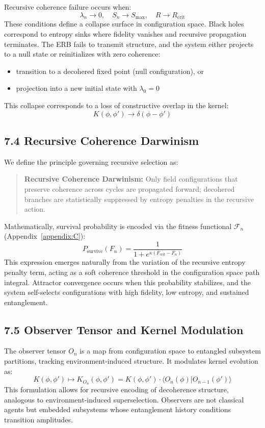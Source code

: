 Recursive coherence failure occurs when:
\[
\lambda_n \to 0, \quad S_n \to S_{\text{max}}, \quad R \to R_{\text{crit}}
\]
These conditions define a collapse surface in configuration space. Black holes correspond to entropy sinks where fidelity vanishes and recursive propagation terminates. The ERB fails to transmit structure, and the system either projects to a null state or reinitializes with zero coherence:
\begin{itemize}
    \item transition to a decohered fixed point (null configuration), or
    \item projection into a new initial state with \( \lambda_0 = 0 \)
\end{itemize}
This collapse corresponds to a loss of constructive overlap in the kernel:
\[
K(\phi, \phi') \to \delta(\phi - \phi')
\]

\subsection{7.4 Recursive Coherence Darwinism}

We define the principle governing recursive selection as:
\begin{quote}
\textbf{Recursive Coherence Darwinism:} Only field configurations that preserve coherence across cycles are propagated forward; decohered branches are statistically suppressed by entropy penalties in the recursive action.
\end{quote}

Mathematically, survival probability is encoded via the fitness functional \( \mathcal{F}_n \) (Appendix~\ref{appendix:C}):
\[
P_{\text{survive}}(F_n) = \frac{1}{1 + e^{\kappa(F_{\text{crit}} - F_n)}}
\]
This expression emerges naturally from the variation of the recursive entropy penalty term, acting as a soft coherence threshold in the configuration space path integral. Attractor convergence occurs when this probability stabilizes, and the system self-selects configurations with high fidelity, low entropy, and sustained entanglement.

\subsection{7.5 Observer Tensor and Kernel Modulation}

The observer tensor \( O_n \) is a map from configuration space to entangled subsystem partitions, tracking environment-induced structure. It modulates kernel evolution as:
\[
K(\phi, \phi') \mapsto K_{O_n}(\phi, \phi') = K(\phi, \phi') \cdot \langle O_n(\phi) | O_{n-1}(\phi') \rangle
\]
This formulation allows for recursive encoding of decoherence structure, analogous to environment-induced superselection. Observers are not classical agents but embedded subsystems whose entanglement history conditions transition amplitudes.

